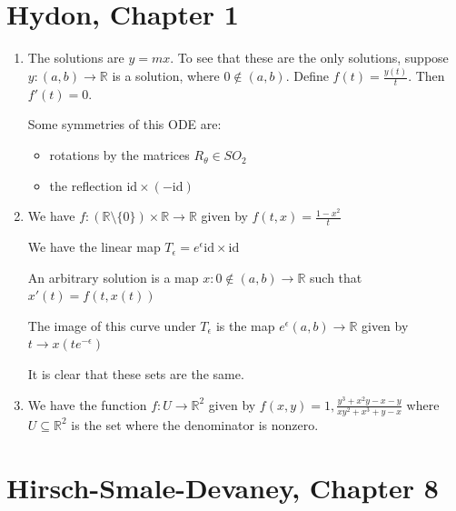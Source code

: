 \documentclass{article}
\begin{document}
\section{Hydon, Chapter 1}

\begin{enumerate}
    \item The solutions are $y=mx$. To see that these are the only solutions, suppose $y:(a,b) \to \mathbb{R}$ is a solution, where $0 \notin (a,b)$. Define $f(t)=\frac{y(t)}{t}$. Then $f'(t)=0$.

    Some symmetries of this ODE are:
    \begin{itemize}
        \item rotations by the matrices $R_\theta \in SO_2$

        \item the reflection $\text{id} \times (-\text{id})$
    \end{itemize}

    \item We have $f:(\mathbb{R} \setminus \{0\}) \times \mathbb{R} \to \mathbb{R}$ given by $f(t,x)=\frac{1-x^2}{t}$

    We have the linear map $T_\epsilon=e^\epsilon\text{id} \times \text{id}$

    An arbitrary solution is a map $x:0 \notin (a,b) \to \mathbb{R}$ such that $x'(t)=f(t,x(t))$

    The image of this curve under $T_\epsilon$ is the map $e^\epsilon(a,b) \to \mathbb{R}$ given by $t \to x(te^{-\epsilon})$

    It is clear that these sets are the same.

    \item We have the function $f:U \to \mathbb{R}^2$ given by $f(x,y)=1,\frac{y^3+x^2y-x-y}{xy^2+x^3+y-x}$ where $U \subseteq \mathbb{R}^2$ is the set where the denominator is nonzero.

\end{enumerate}



\section{Hirsch-Smale-Devaney, Chapter 8}
\end{document}
